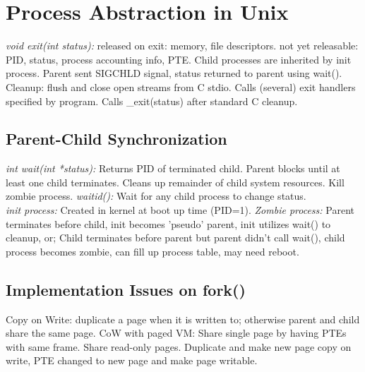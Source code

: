 \section{Process Abstraction in Unix}
\emph{void exit(int status):} released on exit: memory, file descriptors. not yet releasable: PID, status, process accounting info, PTE. Child processes are inherited by init process. Parent sent SIGCHLD signal, status returned to parent using wait(). Cleanup: flush and close open streams from C stdio. Calls (several) exit handlers specified by program. Calls \_exit(status) after standard C cleanup.

\subsection*{Parent-Child Synchronization}
\emph{int wait(int *status):} Returns PID of terminated child. Parent blocks until at least one child terminates. Cleans up remainder of child system resources. Kill zombie process. \emph{waitid():} Wait for any child process to change status.\\
\emph{init process:} Created in kernel at boot up time (PID=1). \emph{Zombie process:} Parent terminates before child, init becomes 'pseudo' parent, init utilizes wait() to cleanup, or; Child terminates before parent but parent didn't call wait(), child process becomes zombie, can fill up process table, may need reboot.

\subsection*{Implementation Issues on fork()}
Copy on Write: duplicate a page when it is written to; otherwise parent and child share the same page. CoW with paged VM: Share single page by having PTEs with same frame. Share read-only pages. Duplicate and make new page copy on write, PTE changed to new page and make page writable.